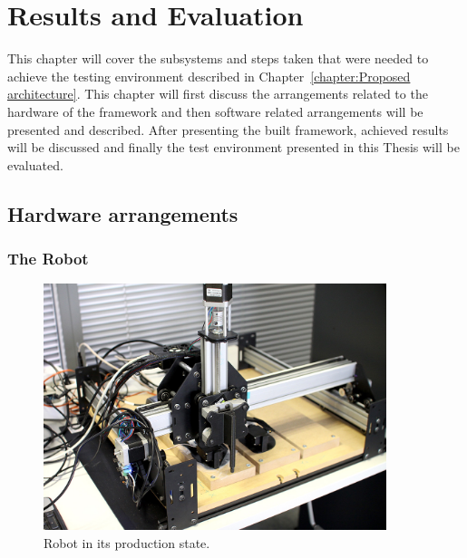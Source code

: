 
\chapter{Results and Evaluation}
\label{chapter:Results and Evaluation}

This chapter will cover the subsystems and steps taken that were needed to achieve the testing environment described in Chapter~\ref{chapter:Proposed architecture}. This chapter will first discuss the arrangements related to the hardware of the framework and then software related arrangements will be presented and described. After presenting the built framework, achieved results will be discussed and finally the test environment presented in this Thesis will be evaluated.

\section{Hardware arrangements}
\label{section:Hardware arrangements}

\subsection{The Robot}
\label{subsection:Robot}

\begin{figure}[ht]
  \begin{center}
    \includegraphics[width=10cm]{images/robot.jpg}
    \caption{Robot in its production state.}
    \label{fig:invalid_pin_test}
  \end{center}
\end{figure}
\FloatBarrier

